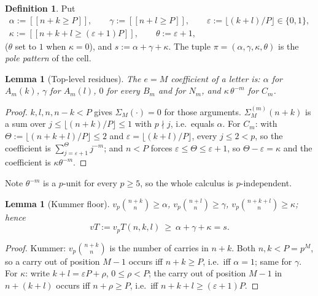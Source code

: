 \documentclass[11pt,reqno]{amsart}
\theoremstyle{plain}
\newtheorem{lemma}[theorem]{Lemma}
\theoremstyle{definition}
\newtheorem{definition}[theorem]{Definition}
\theoremstyle{remark}
\numberwithin{equation}{section}
\newcommand{\ii}[1]{[\![#1]\!]}
\begin{document}
\begin{definition}\label{def:pattern}
Put
\[
\begin{gathered}
\alpha:=\ii{n+k\ge P},\qquad \gamma:=\ii{n+l\ge P},\qquad
\varepsilon:=\lfloor(k+l)/P\rfloor\in\{0,1\},\\
\kappa:=\ii{n+k+l\ge(\varepsilon+1)P},\qquad \theta:=\varepsilon+1,
\end{gathered}
\]
($\theta$ set to $1$ when $\kappa=0$), and $s:=\alpha+\gamma+\kappa$. The tuple
$\pi=(\alpha,\gamma,\kappa,\theta)$ is the \emph{pole pattern} of the cell.
\end{definition}

\begin{lemma}[Top-level residues]\label{lem:R}
The $e=M$ coefficient of a letter is: $\alpha$ for $A_m(k)$, $\gamma$ for $A_m(l)$, $0$ for
every $B_m$ and for $N_m$, and $\kappa\,\theta^{-m}$ for $C_m$.
\end{lemma}

\begin{proof}
$k,l,n,n-k<P$ gives $\Sigma_M(\cdot)=0$ for those arguments. $\Sigma^{(m)}_M(n+k)$ is a sum
over $j\le\lfloor(n+k)/P\rfloor\le1$ with $p\nmid j$, i.e.\ equals $\alpha$. For $C_m$: with
$\Theta:=\lfloor(n+k+l)/P\rfloor\le2$ and $\varepsilon=\lfloor(k+l)/P\rfloor$, every $j\le2<p$,
so the coefficient is $\sum_{j=\varepsilon+1}^{\Theta}j^{-m}$; and $n<P$ forces
$\varepsilon\le\Theta\le\varepsilon+1$, so $\Theta-\varepsilon=\kappa$ and the coefficient is
$\kappa\theta^{-m}$.
\end{proof}

Note $\theta^{-m}$ is a $p$-unit for every $p\ge5$, so the whole calculus is $p$-independent.

\begin{lemma}[Kummer floor]\label{lem:K}
$v_p\binom{n+k}{n}\ge\alpha$, $v_p\binom{n+l}{n}\ge\gamma$, $v_p\binom{n+k+l}{n}\ge\kappa$;
hence
\begin{equation}\label{eq:vTfloor}
vT:=v_pT(n,k,l)\ \ge\ \alpha+\gamma+\kappa=s .
\end{equation}
\end{lemma}

\begin{proof}
Kummer: $v_p\binom{n+k}{n}$ is the number of carries in $n+k$. Both $n,k<P=p^M$, so a carry out
of position $M-1$ occurs iff $n+k\ge P$, i.e.\ iff $\alpha=1$; same for $\gamma$. For $\kappa$:
write $k+l=\varepsilon P+\rho$, $0\le\rho<P$; the carry out of position $M-1$ in $n+(k+l)$
occurs iff $n+\rho\ge P$, i.e.\ iff $n+k+l\ge(\varepsilon+1)P$.
\end{proof}
\end{document}
